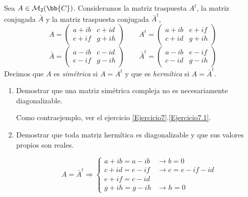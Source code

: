 \begin{ejercicio}
    Sea $A\in \mathcal{M}_2(\bb{C})$. Consideramos la matriz traspuesta $A^t$, la matriz conjugada $\bar{A}$ y la matriz traspuesta conjugada $\bar{A}^t$,
    \begin{equation*}
        A=\left(\begin{array}{cc}
            a+ib & c+id \\
            e+if & g+ih
        \end{array}\right) \qquad
        A^t=\left(\begin{array}{cc}
            a+ib & e+if \\
            c+id & g+ih
        \end{array}\right)
    \end{equation*}
    \begin{equation*}
        \bar{A}=\left(\begin{array}{cc}
            a-ib & c-id \\
            e-if & g-ih
        \end{array}\right) \qquad
        \bar{A}^t=\left(\begin{array}{cc}
            a-ib & e-if \\
            c-id & g-ih
        \end{array}\right)
    \end{equation*}
    Decimos que $A$ es \emph{simétrica} si $A=A^t$ y que es \emph{hermítica} si $A=\bar{A}^t$.

    \begin{enumerate}
        \item Demostrar que una matriz simétrica compleja no es necesariamente diagonalizable.

        Como contraejemplo, ver el ejercicio \ref{Ejercicio7}.\ref{Ejercicio7.1}.

        \item Demostrar que toda matriz hermítica es diagonalizable y que sus valores propios son reales.

        \begin{equation*}
            A=\bar{A}^t \Longrightarrow \left\{
            \begin{array}{ll}
                a+ib = a-ib & \longrightarrow b=0 \\
                c+id = e-if & \longrightarrow c=e-if-id \\
                e+if = c-id & \\
                g+ih = g-ih & \longrightarrow h=0
            \end{array}
            \right.
        \end{equation*}


\end{enumerate}
\end{ejercicio}

